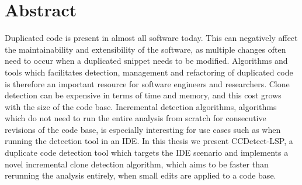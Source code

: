 \chapter*{Abstract}

Duplicated code is present in almost all software today. This can negatively affect the
maintainability and extensibility of the software, as multiple changes often need to occur
when a duplicated snippet needs to be modified. Algorithms and tools which facilitates
detection, management and refactoring of duplicated code is therefore an important
resource for software engineers and researchers. Clone detection can be expensive in terms
of time and memory, and this cost grows with the size of the code base. Incremental
detection algorithms, algorithms which do not need to run the entire analysis from scratch
for consecutive revisions of the code base, is especially interesting for use cases such
as when running the detection tool in an IDE. In this thesis we present CCDetect-LSP, a
duplicate code detection tool which targets the IDE scenario and implements a novel
incremental clone detection algorithm, which aims to be faster than rerunning the analysis
entirely, when small edits are applied to a code base.
